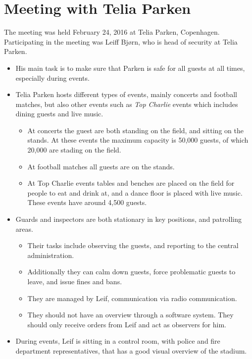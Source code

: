 \section{Meeting with Telia Parken}\label{sec:telia_parken_meeting_summary}

The meeting was held February 24, 2016 at Telia Parken, Copenhagen. Participating in the meeting was Leiff Bjørn, who is head of security at Telia Parken.

\begin{itemize}
    \item His main task is to make sure that Parken is safe for all guests at all times, especially during events.
    \item Telia Parken hosts different types of events, mainly concerts and football matches, but also other events such as \emph{Top Charlie} events which includes dining guests and live music. 
    \begin{itemize}
        \item At concerts the guest are both standing on the field, and sitting on the stands. At these events the maximum capacity is 50,000 guests, of which 20,000 are stading on the field.
        \item At football matches all guests are on the stands.
        \item At Top Charlie events tables and benches are placed on the field for people to eat and drink at, and a dance floor is placed with live music. These events have around 4,500 guests.
    \end{itemize}
    \item Guards and inspectors are both stationary in key positions, and patrolling areas.
    \begin{itemize}
        \item Their tasks include observing the guests, and reporting to the central administration.
        \item Additionally they can calm down guests, force problematic guests to leave, and issue fines and bans.
        \item They are managed by Leif, communication via radio communication.
        \item They should not have an overview through a software system. They should only receive orders from Leif and act as observers for him.
    \end{itemize}
    \item During events, Leif is sitting in a control room, with police and fire department representatives, that has a good visual overview of the stadium.

\end{itemize}
